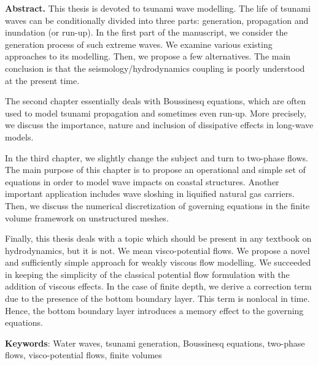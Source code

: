 \vspace{1em}

\textbf{Abstract.} This thesis is devoted to tsunami wave modelling. The life of tsunami waves can be conditionally divided into three parts: generation, propagation and inundation (or run-up). In the first part of the manuscript, we consider the generation process of such extreme waves. We examine various existing approaches to its modelling. Then, we propose a few alternatives. The main conclusion is that the seismology/hydrodynamics coupling is poorly understood at the present time.

The second chapter essentially deals with Boussinesq equations, which are often used to model tsunami propagation and sometimes even run-up. More precisely, we discuss the importance, nature and inclusion of dissipative effects in long-wave models.

In the third chapter, we slightly change the subject and turn to two-phase flows. The main purpose of this chapter is to propose an operational and simple set of equations in order to model wave impacts on coastal structures. Another important application includes wave sloshing in liquified natural gas carriers. Then, we discuss the numerical discretization of governing equations in the finite volume framework on unstructured meshes.

Finally, this thesis deals with a topic which should be present in any textbook on hydrodynamics, but it is not. We mean visco-potential flows. We propose a novel and sufficiently simple approach for weakly viscous flow modelling. We succeeded in keeping the simplicity of the classical potential flow formulation with the addition of viscous effects. In the case of finite depth, we derive a correction term due to the presence of the bottom boundary layer. This term is nonlocal in time. Hence, the bottom boundary layer introduces a memory effect to the governing equations.

\bigskip
\textbf{Keywords}: Water waves, tsunami generation, Boussinesq equations, two-phase flows, visco-potential flows, finite volumes